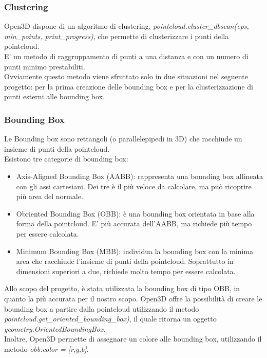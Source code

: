 \documentclass[italian]{article}
\begin{document}
\subsubsection*{Clustering}
Open3D dispone di un algoritmo di clustering, \textit{pointcloud.cluster\_dbscan(eps, min\_points, print\_progress)}, che permette di clusterizzare i punti della pointcloud.\\
E' un metodo di raggruppamento di punti a una distanza e con un numero di punti minimo prestabiliti.\\
Ovviamente questo metodo viene sfruttato solo in due situazioni nel seguente progetto: per la prima creazione delle bounding box e per la clusterizzazione di punti esterni alle bounding box.
\subsubsection{Bounding Box}
Le Bounding box sono rettangoli (o parallelepipedi in 3D) che racchiude un insieme di punti della pointcloud.\\
Esistono tre categorie di bounding box:
\begin{itemize}
	\item Axis-Aligned Bounding Box (AABB): rappresenta una bounding box allineata con gli assi cartesiani. Dei tre è il più veloce da calcolare, ma può ricoprire più area del normale.
	\item Obriented Bounding Box (OBB): è una bounding box orientata in base alla forma della pointcloud. E' più accurata dell'AABB, ma richiede più tempo per essere calcolata.
	\item Minimum Bounding Box (MBB): individua la bounding box con la minima area che racchiude l'insieme di punti della pointcloud. Soprattutto in dimensioni superiori a due, richiede molto tempo per essere calcolata.
\end{itemize}
Allo scopo del progetto, è stata utilizzata la bounding box di tipo OBB, in quanto la più accurata per il nostro scopo.
Open3D offre la possibilità di creare le bounding box a partire dalla pointcloud utilizzando il metodo \textit{pointcloud.get\_oriented\_bounding\_box)}, il quale ritorna un oggetto \textit{geometry.OrientedBoundingBox}.\\
Inoltre, Open3D permette di assegnare un colore alle bounding box, utilizzando il metodo \textit{obb.color = [r,g,b]}.
\end{document}
